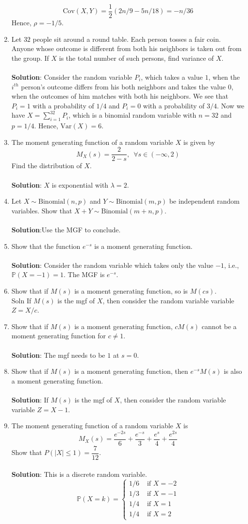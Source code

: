 \documentclass{article}
\newcommand{\dsum}{\displaystyle\sum}
\newcommand{\abs}[1]{\displaystyle\left\lvert#1\right\rvert}
\newcommand{\Pb}{\mathbb{P}}
\newcommand{\bkt}[1]{\left(#1\right)}
\newcommand{\soln}[1]{\\ \textbf{Solution}:#1\\}
\begin{document}
\begin{enumerate}
{	$$\text{Cov}\bkt{X,Y} = \dfrac12\bkt{2n/9-5n/18} = -n/36$$
	Hence, $\rho = -1/5$.
	}
	\item
	Let $32$ people sit around a round table. Each person tosses a fair coin. Anyone whose outcome is different from both his neighbors is taken out from the group. If $X$ is the total number of such persons, find variance of $X$.\\
	\soln{
	Consider the random variable $P_i$, which takes a value $1$, when the $i^{th}$ person's outcome differs from his both neighbors and takes the value $0$, when the outcomes of him matches with both his neighbors. We see that $P_i = 1$ with a probability of $1/4$ and $P_i=0$ with a probability of $3/4$. Now we have $X = \dsum_{i=1}^{32} P_i$, which is a binomial random variable with $n=32$ and $p=1/4$. Hence, $\text{Var}\bkt{X} = 6$.
	}
	\item
	The moment generating function of a random variable $X$ is given by
	$$M_X(s) = \dfrac2{2-s}, \,\,\, \forall s \in (-\infty,2)$$
	Find the distribution of $X$.\\
	\soln{
	$X$ is exponential with $\lambda=2$.}
	\item
	Let $X \sim \text{Binomial}(n,p)$ and $Y \sim \text{Binomial}(m,p)$ be independent random variables. Show that $X+Y \sim \text{Binomial}(m+n,p)$.\\
	\soln{Use the MGF to conclude.}
	\item
	Show that the function $e^{-s}$ is a moment generating function.\\
	\soln{
	Consider the random variable which takes only the value $-1$, i.e., $\Pb\bkt{X=-1}=1$. The MGF is $e^{-s}$.
	}
	\item
	Show that if $M(s)$ is a moment generating function, so is $M(cs)$.\\
	Soln{
	If $M(s)$ is the mgf of $X$, then consider the random variable variable $Z = X/c$.
	}
	\item
	Show that if $M(s)$ is a moment generating function, $cM(s)$ cannot be a moment generating function for $c \neq 1$.\\
	\soln{
	The mgf needs to be $1$ at $s=0$.
	}
	\item
	Show that if $M(s)$ is a moment generating function, then $e^{-s}M(s)$ is also a moment generating function.\\
	\soln{
	If $M(s)$ is the mgf of $X$, then consider the random variable variable $Z = X-1$.
	}
	\item
	The moment generating function of a random variable $X$ is
	$$M_X(s) = \dfrac{e^{-2s}}6 + \dfrac{e^{-s}}3 + \dfrac{e^{s}}4 + \dfrac{e^{2s}}4$$
	Show that $P\bkt{\abs{X} \leq 1} = \dfrac7{12}$.\\
	\soln{
	This is a discrete random variable.
	$$\Pb\bkt{X=k}=\begin{cases}
	1/6 & \text{ if }X=-2\\
	1/3 & \text{ if }X=-1\\
	1/4 & \text{ if }X=1\\
	1/4 & \text{ if }X=2
	\end{cases}$$
	}
	\end{enumerate}
\end{document}
